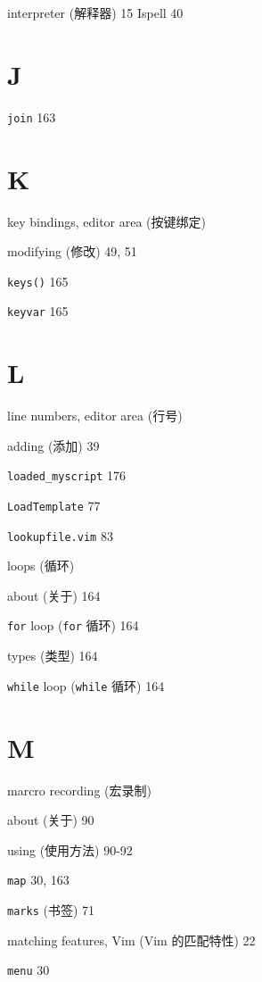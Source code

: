 \begin{multicols}{2}
interpreter (解释器) 15
Ispell 40

\section*{J}

\texttt{join} 163

\section*{K}

key bindings, editor area (按键绑定) \par
  modifying (修改) 49, 51 \par

\texttt{keys()} 165

\texttt{keyvar} 165

\section*{L}

line numbers, editor area (行号) \par
  adding (添加) 39 \par

\texttt{loaded\_myscript} 176

\texttt{LoadTemplate} 77

\texttt{lookupfile.vim} 83

loops (循环) \par
  about (关于) 164 \par
  \texttt{for} loop (\texttt{for} 循环) 164 \par
  types (类型) 164 \par
  \texttt{while} loop (\texttt{while} 循环) 164 \par

\section*{M}

marcro recording (宏录制) \par
  about (关于) 90 \par
  using (使用方法) 90-92 \par

\texttt{map} 30, 163

\texttt{marks} (书签) 71

matching features, Vim (Vim 的匹配特性) 22

\texttt{menu} 30


\end{multicols}
